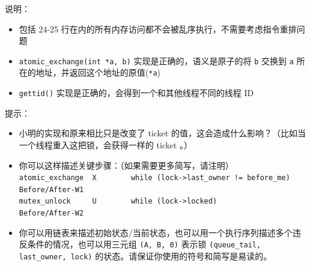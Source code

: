 \documentclass[a4paper,12pt]{article}
\begin{document}
说明：

\begin{itemize}
  \item 包括 24-25 行在内的所有内存访问都不会被乱序执行，不需要考虑指令重排问题
  \item \verb|atomic_exchange(int *a, b)| 实现是正确的，语义是原子的将 \verb|b| 交换到 \verb|a| 所在的地址，并返回这个地址的原值(\verb|*a|)
  \item \verb|gettid()| 实现是正确的，会得到一个和其他线程不同的线程 ID
\end{itemize}

提示：

\begin{itemize}
  \item 小明的实现和原来相比只是改变了 ticket 的值，这会造成什么影响？（比如当一个线程重入这把锁，会获得一样的 ticket 。）
  \item 你可以这样描述关键步骤：（如果需要更多简写，请注明） \\
  \small\verb|atomic_exchange  X		while (lock->last_owner != before_me) Before/After-W1| \\
  \small\verb|mutex_unlock     U		while (lock->locked) 				 Before/After-W2|
  \item 你可以用链表来描述初始状态/当前状态，也可以用一个执行序列描述多个违反条件的情况，也可以用三元组 \verb|(A, B, 0)| 表示锁 \verb|(queue_tail, last_owner, lock)| 的状态。请保证你使用的符号和简写是易读的。
\end{itemize}

\begin{answer}
  \lipsum[3]
\end{answer}

\label{LastPage}
\end{document}
